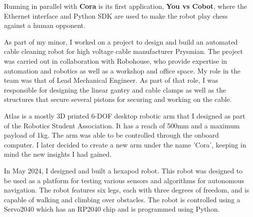 \documentclass[8pt, a4paper, withhyper]{altacv}
\begin{document}
\begin{paracol}
    \divider
    
     {}
      Running in parallel with \textbf{Cora} is its first application, \textbf{You vs Cobot}, 
      where the Ethernet interface and Python SDK are used 
      to make the robot play chess against a human opponent.
      
      \divider
      
       As part of my
      minor, I worked on a project to design and build an automated cable cleaning
      robot for high voltage cable manufacturer Prysmian. 
      The project was carried out in collaboration with
      Robohouse, who provide expertise in automation and robotics as well as a workshop
      and office space. My role in the team was that of Lead Mechanical Engineer. 
      As part of that role, I was responsible for designing the linear gantry and
      cable clamps as well as the structures that secure several pistons for securing and
      working on the cable.
      
      \divider
      
       Atlas
      is a mostly 3D printed 6-DOF desktop robotic arm that I designed as part of
      the Robotics Student Association. It has a reach of 500mm and a maximum payload
      of 1kg. The arm was able to be controlled through the onboard computer. I later
      decided to create a new arm under the name 'Cora', keeping in mind
      the new insights I had gained.
      
      \divider
      
       In May 2024,
      I designed and built a hexapod robot. This robot was designed to be used as
      a platform for testing various sensors and algorithms for autonomous
      navigation. The robot features six legs, each with three degrees of freedom,
      and is capable of walking and climbing over obstacles. The robot is
      controlled using a Servo2040 which has an RP2040 chip and is programmed
      using Python.
      
      
      
      

\end{paracol}
\end{document}
